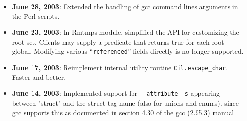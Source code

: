 \documentclass{article}
\def\t#1{{\tt #1}}
\begin{document}
\begin{itemize}
\item {\bf June 28, 2003}: Extended the handling of gcc command lines
arguments in the Perl scripts. 

\item {\bf June 23, 2003}: In Rmtmps module, simplified the API for
  customizing the root set.  Clients may supply a predicate that
  returns true for each root global.  Modifying various
  ``\texttt{referenced}'' fields directly is no longer supported.

\item {\bf June 17, 2003}: Reimplement internal utility routine
           \t{Cil.escape\_char}. Faster and better. 

\item {\bf June 14, 2003}: Implemented support for \t{\_\_attribute\_\_s}
appearing between "struct" and the struct tag name (also for unions and
enums), since gcc supports this as documented in section 4.30 of the gcc
(2.95.3) manual


\end{itemize}
\end{document}
